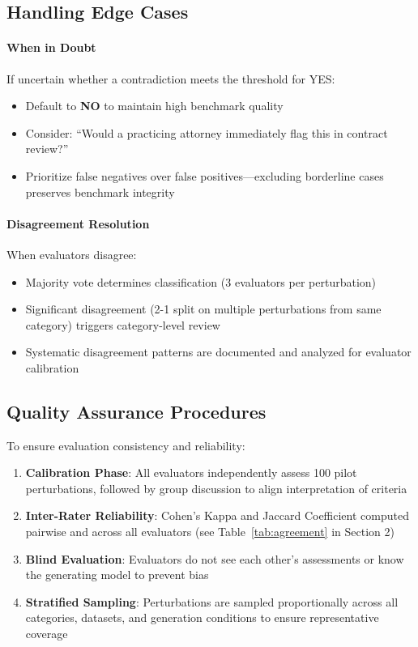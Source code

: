 \documentclass[11pt]{article}
\begin{document}
\subsection{Handling Edge Cases}

\paragraph{When in Doubt} If uncertain whether a contradiction meets the threshold for YES:
\begin{itemize}[leftmargin=*,itemsep=0.1em]
    \item Default to \textbf{NO} to maintain high benchmark quality
    \item Consider: ``Would a practicing attorney immediately flag this in contract review?''
    \item Prioritize false negatives over false positives—excluding borderline cases preserves benchmark integrity
\end{itemize}

\paragraph{Disagreement Resolution} When evaluators disagree:
\begin{itemize}[leftmargin=*,itemsep=0.1em]
    \item Majority vote determines classification (3 evaluators per perturbation)
    \item Significant disagreement (2-1 split on multiple perturbations from same category) triggers category-level review
    \item Systematic disagreement patterns are documented and analyzed for evaluator calibration
\end{itemize}

\subsection{Quality Assurance Procedures}

To ensure evaluation consistency and reliability:
\begin{enumerate}[leftmargin=*,itemsep=0.1em]
    \item \textbf{Calibration Phase}: All evaluators independently assess 100 pilot perturbations, followed by group discussion to align interpretation of criteria
    \item \textbf{Inter-Rater Reliability}: Cohen's Kappa and Jaccard Coefficient computed pairwise and across all evaluators (see Table~\ref{tab:agreement} in Section 2)
    \item \textbf{Blind Evaluation}: Evaluators do not see each other's assessments or know the generating model to prevent bias
    \item \textbf{Stratified Sampling}: Perturbations are sampled proportionally across all categories, datasets, and generation conditions to ensure representative coverage
\end{enumerate}
\end{document}
